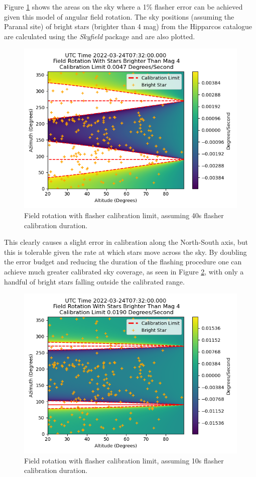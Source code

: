 Figure \ref{fig:rot40s} shows the areas on the sky where a 1\% flasher error can be achieved given this model of angular field rotation. The sky positions (assuming the Paranal site) of bright stars (brighter than 4 mag) from the Hipparcos catalogue are calculated using the \textit{Skyfield} package and are also plotted.
\begin{figure}[h]
\begin{centering}
\includegraphics[width=0.7\columnwidth]{./figures/rot40s.png}
\caption{Field rotation with flasher calibration limit, assuming 40s flasher calibration duration.}
\label{fig:rot40s}
\end{centering}
\end{figure}

This clearly causes a slight error in calibration along the North-South axis, but this is tolerable given the rate at which stars move across the sky. By doubling the error budget and reducing the duration of the flashing procedure one can achieve much greater calibrated sky coverage, as seen in Figure \ref{fig:rot10s}, with only a handful of bright stars falling outside the calibrated range.

\begin{figure}[h]
\begin{centering}
\includegraphics[width=0.7\columnwidth]{./figures/rot10s.png}
\caption{Field rotation with flasher calibration limit, assuming 10s flasher calibration duration.}
\label{fig:rot10s}
\end{centering}
\end{figure}

